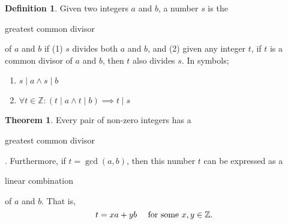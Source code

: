\documentclass{article}
\theoremstyle{definition}
\newtheorem{theorem}{Theorem}
\theoremstyle{definition}
\newtheorem{definition}{Definition}
\newenvironment{enumerated}{ 
\begin{enumerate}
\setlength{\itemsep}{0pt}
\setlength{\parskip}{0pt}
\setlength{\parsep}{0pt}     
}{\end{enumerate}}
\begin{document}
\begin{definition}
  Given two integers $a$ and $b$, a number $s$ is the \begin{em}greatest common divisor\end{em} of $a$ and $b$ if (1) $s$ divides both $a$ and $b$, and (2) given any integer $t$, if $t$ is a common divisor of $a$ and $b$, then $t$ also divides $s$. In symbols;
  \begin{enumerated}
    \item $s \mid a \wedge s \mid b$
    \item $\forall t \in \mathbb{Z} : (t \mid a \wedge t \mid b) \implies t \mid s$
  \end{enumerated}
\end{definition}

\begin{theorem} 
  Every pair of non-zero integers has a \begin{em}greatest common divisor\end{em}. Furthermore, if $t = \gcd (a, b)$, then this number $t$ can be expressed as a \begin{em}linear combination\end{em} of $a$ and $b$. That is, 
  $$t = xa + yb \text{ \quad for some $x, y \in \mathbb{Z}$. }$$
\end{theorem}
\end{document}

